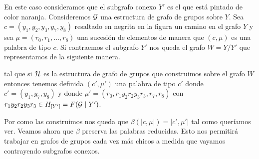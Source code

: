 \documentclass[tesis.tex]{subfiles}
\begin{document}
\begin{ej}
	En este caso consideramos que el subgrafo conexo $Y'$ es el que está pintado de color \textcolor{carrotorange}{naranja}.
	Consideremos ${\cal G}$ una estructura de grafo de grupos sobre $Y$.
	Sea $c = (y_1, y_2, y_3, y_7, y_8)$ resaltado en negrita en la figura un camino en el grafo $Y$ y sea $\mu = (r_0, r_1, \dots, r_8)$ una sucesión de elementos de manera que $(c, \mu)$ es una palabra de tipo $c$.
	Si contraemos el subgrafo $Y'$ nos queda el grafo $W=Y/Y'$ que representamos de la siguiente manera.
	\begin{center}
	\end{center}
	tal que si ${\cal H}$ es la estructura de grafo de grupos que construimos sobre el grafo $W$ entonces tenemos definida $(c', \mu')$ una palabra de tipo $c'$ donde
	 $c' = (y_1,y_7,y_8)$ y donde $\mu'=(r_0,r_1y_2r_2y_3r_3,r_7,r_8)$ con $r_1y_2r_2y_3r_3 \in H_{[Y']} = F({\cal G} \mid Y')$.
	
	
	
\end{ej}





Por como las construimos nos queda que $\beta(|c,\mu|) = |c',\mu'|$ tal como queríamos ver.
Veamos ahora que $\beta$ preserva las palabras reducidas. 
Esto nos permitirá trabajar en grafos de grupos cada vez más chicos a medida que vayamos contrayendo subgrafos conexos.
\end{document}

